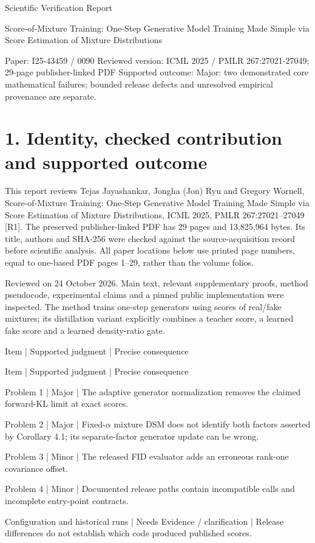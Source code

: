 \documentclass[10pt]{article}
\begin{document}
Scientific Verification Report\par
Score-of-Mixture Training: One-Step Generative Model Training Made Simple via Score Estimation of Mixture Distributions\par
Paper: I25-43459 / 0090
Reviewed version: ICML 2025 / PMLR 267:27021-27049; 29-page publisher-linked PDF
Supported outcome: Major: two demonstrated core mathematical failures; bounded release defects and unresolved empirical provenance are separate.\par
\section*{1. Identity, checked contribution and supported outcome}
This report reviews Tejas Jayashankar, Jongha (Jon) Ryu and Gregory Wornell, Score-of-Mixture Training: One-Step Generative Model Training Made Simple via Score Estimation of Mixture Distributions, ICML 2025, PMLR 267:27021–27049 [R1]. The preserved publisher-linked PDF has 29 pages and 13,825,964 bytes. Its title, authors and SHA-256 were checked against the source-acquisition record before scientific analysis. All paper locations below use printed page numbers, equal to one-based PDF pages 1–29, rather than the volume folios.\par
Reviewed on 24 October 2026. Main text, relevant supplementary proofs, method pseudocode, experimental claims and a pinned public implementation were inspected. The method trains one-step generators using scores of real/fake mixtures; its distillation variant explicitly combines a teacher score, a learned fake score and a learned density-ratio gate.\par
Item | Supported judgment | Precise consequence\par
Item | Supported judgment | Precise consequence\par
Problem 1 | Major | The adaptive generator normalization removes the claimed forward-KL limit at exact scores.\par
Problem 2 | Major | Fixed-\(\alpha\) mixture DSM does not identify both factors asserted by Corollary 4.1; its separate-factor generator update can be wrong.\par
Problem 3 | Minor | The released FID evaluator adds an erroneous rank-one covariance offset.\par
Problem 4 | Minor | Documented release paths contain incompatible calls and incomplete entry-point contracts.\par
Configuration and historical runs | Needs Evidence / clarification | Release differences do not establish which code produced published scores.\par
\end{document}
